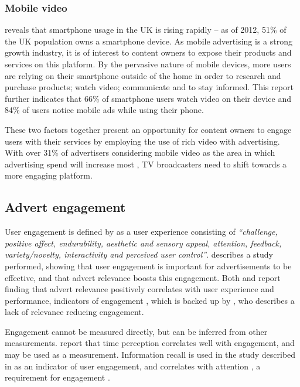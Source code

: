 
	\subsubsection{Mobile video}

		\citet{mobile-planet} reveals that smartphone usage in the UK is rising rapidly -- as of 2012, 51\% of the UK population owns a smartphone device. As mobile advertising is a strong growth industry, it is of interest to content owners to expose their products and services on this platform. By the pervasive nature of mobile devices, more users are relying on their smartphone outside of the home in order to research and purchase products; watch video; communicate and to stay informed. This report further indicates that 66\% of smartphone users watch video on their device and 84\% of users notice mobile ads while using their phone. 

		These two factors together present an opportunity for content owners to engage users with their services by employing the use of rich video with advertising. With over 31\% of advertisers considering mobile video as the area in which advertising spend will increase most \citep{brightroll-report}, TV broadcasters need to shift towards a more engaging platform.

\subsection{Advert engagement}

	User engagement is defined by \citet{what_is_engagement} as a user experience consisting of \textit{``challenge, positive affect, endurability, aesthetic and sensory appeal, attention, feedback, variety/novelty, interactivity and perceived user control''}. \citet{advertising_engagement} describes a study performed, showing that user engagement is important for advertisements to be effective, and that advert relevance boosts this engagement. Both \citet{advertising_engagement} and \citet{yahoo-intrusive-advertising} report finding that advert relevance positively correlates with user experience and performance, indicators of engagement \citep{what_is_engagement}, which is backed up by \citet{plummer2006measures}, who describes a lack of relevance reducing engagement.

	Engagement cannot be measured directly, but can be inferred from other measurements. \citet{time_perception} report that time perception correlates well with engagement, and may be used as a measurement. Information recall is used in the study described in \citep{advertising_engagement} as an indicator of user engagement, and correlates with attention \citep{interactions_attention_memory}, a requirement for engagement \cite{what_is_engagement}.

